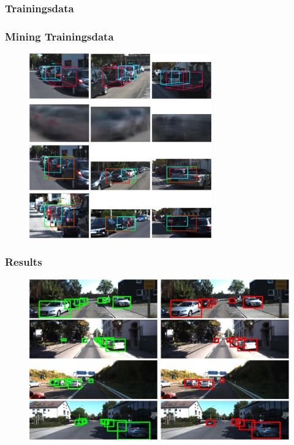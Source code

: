 \documentclass[xcolor=dvipsnames]{beamer}
\begin{document}
\subsubsection{Trainingsdata}
\begin{frame}
	\frametitle{Mining Trainingsdata}
	\begin{figure}
	\includegraphics[width=0.7\textwidth]{img/dpmoc_2.png}
	\end{figure}
\end{frame}



\subsubsection{Results}
\begin{frame}
	\begin{figure}
	\includegraphics[width=\textwidth]{img/dpmoc_1.png}
	\end{figure}
\end{frame}
\end{document}

